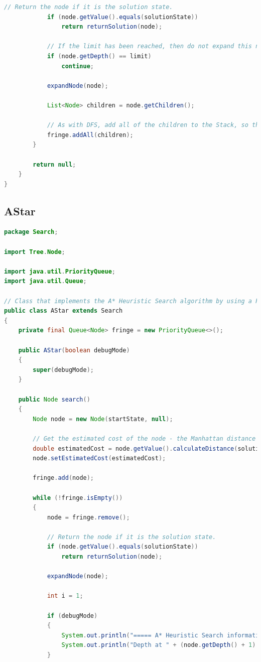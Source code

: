 \documentclass{article}
\begin{document}
\begin{appendices}
\begin{lstlisting}[language=Java]
			// Return the node if it is the solution state.
			if (node.getValue().equals(solutionState))
				return returnSolution(node);
		
			// If the limit has been reached, then do not expand this node.
			if (node.getDepth() == limit)
				continue;
		
			expandNode(node);
		
			List<Node> children = node.getChildren();
		
			// As with DFS, add all of the children to the Stack, so they are the next nodes to be checked.
			fringe.addAll(children);
		}
	
		return null;
	}
}
\end{lstlisting}
		
		\newpage
		\subsection{AStar}
\begin{lstlisting}[language=Java]
package Search;

import Tree.Node;

import java.util.PriorityQueue;
import java.util.Queue;

// Class that implements the A* Heuristic Search algorithm by using a PriorityQueue that prioritises nodes by their heuristic.
public class AStar extends Search
{
	private final Queue<Node> fringe = new PriorityQueue<>();
	
	public AStar(boolean debugMode)
	{
		super(debugMode);
	}
	
	public Node search()
	{
		Node node = new Node(startState, null);
		
		// Get the estimated cost of the node - the Manhattan distance (heuristic) between the grid state and that of the solution.
		double estimatedCost = node.getValue().calculateDistance(solutionState);
		node.setEstimatedCost(estimatedCost);
		
		fringe.add(node);
		
		while (!fringe.isEmpty())
		{
			node = fringe.remove();
			
			// Return the node if it is the solution state.
			if (node.getValue().equals(solutionState))
				return returnSolution(node);
			
			expandNode(node);
			
			int i = 1;
			
			if (debugMode)
			{
				System.out.println("===== A* Heuristic Search information =====\n");
				System.out.println("Depth at " + (node.getDepth() + 1) + "\n");
			}
			

\end{lstlisting}
\end{appendices}
\end{document}
